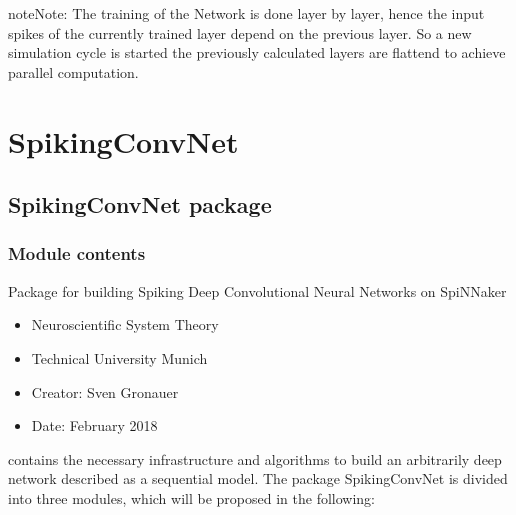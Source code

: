 \documentclass[letterpaper,10pt,english]{sphinxmanual}
\begin{document}
\begin{sphinxadmonition}{note}{Note:}
The training of the Network is done layer by layer, hence the input spikes of the currently trained layer depend on the previous layer.
So a new simulation cycle is started the previously calculated layers are flattend to achieve parallel computation.
\end{sphinxadmonition}


\chapter{SpikingConvNet}
\label{\detokenize{modules:spikingconvnet}}\label{\detokenize{modules::doc}}

\section{SpikingConvNet package}
\label{\detokenize{SpikingConvNet:spikingconvnet-package}}\label{\detokenize{SpikingConvNet::doc}}

\subsection{Module contents}
\label{\detokenize{SpikingConvNet:module-SpikingConvNet}}\label{\detokenize{SpikingConvNet:module-contents}}
Package for building Spiking Deep Convolutional Neural Networks on SpiNNaker
\begin{itemize}
\item {} 
Neuroscientific System Theory

\item {} 
Technical University Munich

\item {} 
Creator:    Sven Gronauer

\item {} 
Date:       February 2018

\end{itemize}

contains the necessary infrastructure and algorithms to build an arbitrarily deep
network described as a sequential model. The package SpikingConvNet is divided
into three modules, which will be proposed in the following:
\end{document}
